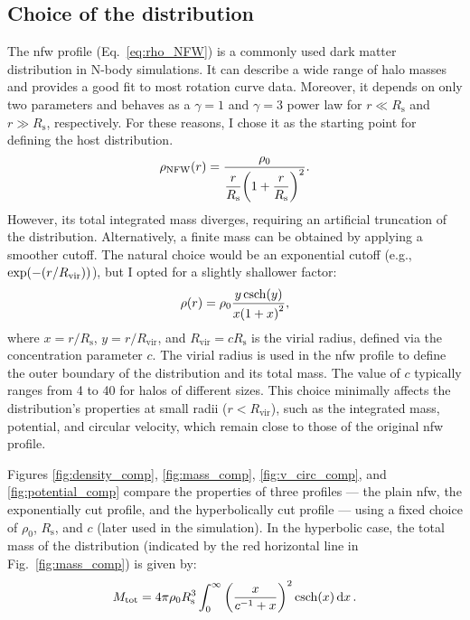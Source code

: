 \documentclass[twocolumn, a4paper]{article}
\begin{document}
\subsection{Choice of the distribution}

The \acrfull{nfw} profile (Eq.~\ref{eq:rho_NFW}) is a commonly used dark matter distribution in N-body simulations. It can describe a wide range of halo masses and provides a good fit to most rotation curve data. Moreover, it depends on only two parameters and behaves as a \(\gamma = 1\) and \(\gamma = 3\) power law for \(r \ll R_\text{s}\) and \(r \gg R_\text{s}\), respectively. For these reasons, I chose it as the starting point for defining the host distribution.
\begin{equation}
    \rho_\text{NFW}\qty(r) = \dfrac{\rho_0}{\dfrac{r}{R_\text{s}} \qty(1 + \dfrac{r}{R_\text{s}})^2}.
    \label{eq:rho_NFW}
\end{equation}
However, its total integrated mass diverges, requiring an artificial truncation of the distribution. Alternatively, a finite mass can be obtained by applying a smoother cutoff. The natural choice would be an exponential cutoff (e.g., \(\exp(-\qty(r/R_\text{vir}))\)), but I opted for a slightly shallower factor:
\begin{equation}
    \rho\qty(r) = \rho_0 \dfrac{y \csch(y)}{x \qty(1 + x)^2},
    \label{eq:rho}
\end{equation}
where \(x = r / R_\text{s}\), \(y = r / R_\text{vir}\), and \(R_\text{vir} = c R_\text{s}\) is the virial radius, defined via the concentration parameter \(c\). The virial radius is used in the \acrshort{nfw} profile to define the outer boundary of the distribution and its total mass. The value of \(c\) typically ranges from 4 to 40 for halos of different sizes. This choice minimally affects the distribution’s properties at small radii (\(r < R_\text{vir}\)), such as the integrated mass, potential, and circular velocity, which remain close to those of the original \acrshort{nfw} profile.

Figures \ref{fig:density_comp}, \ref{fig:mass_comp}, \ref{fig:v_circ_comp}, and \ref{fig:potential_comp} compare the properties of three profiles — the plain \acrshort{nfw}, the exponentially cut profile, and the hyperbolically cut profile — using a fixed choice of \(\rho_0\), \(R_\text{s}\), and \(c\) (later used in the simulation). In the hyperbolic case, the total mass of the distribution (indicated by the red horizontal line in Fig.~\ref{fig:mass_comp}) is given by:
\begin{equation}
    M_\text{tot} = 4 \pi \rho_0 R_\text{s}^3 \int_0^\infty \qty(\frac{x}{c^{-1} + x})^2 \csch(x) \dd{x}.
    \label{eq:M_tot}
\end{equation}
\end{document}

